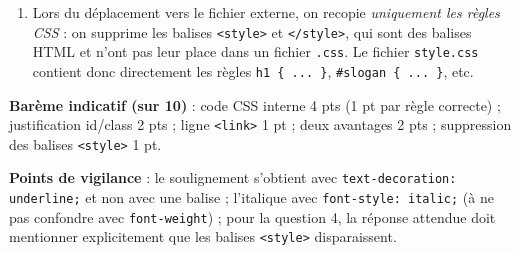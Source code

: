 \documentclass[11pt]{article}
\newcommand{\cle}[1]{{\popxbold\color{popdark}#1}}
\begin{document}
\begin{corrige}
\begin{enumerate}
\begin{enumerate}
\begin{itemize}
    \end{itemize}
  \end{enumerate}
  \item Lors du déplacement vers le fichier externe, on recopie \emph{uniquement les règles CSS} : on supprime les balises \texttt{<style>} et \texttt{</style>}, qui sont des balises \cle{HTML} et n'ont pas leur place dans un fichier \texttt{.css}. Le fichier \texttt{style.css} contient donc directement les règles \texttt{h1 \{ ... \}}, \texttt{\#slogan \{ ... \}}, etc.
\end{enumerate}
\textbf{Barème indicatif (sur 10)} : code CSS interne 4 pts (1 pt par règle correcte) ; justification id/class 2 pts ; ligne \texttt{<link>} 1 pt ; deux avantages 2 pts ; suppression des balises \texttt{<style>} 1 pt.

\textbf{Points de vigilance} : le soulignement s'obtient avec \texttt{text-decoration: underline;} et non avec une balise ; l'italique avec \texttt{font-style: italic;} (à ne pas confondre avec \texttt{font-weight}) ; pour la question 4, la réponse attendue doit mentionner explicitement que les balises \texttt{<style>} disparaissent.
\end{corrige}
\end{document}
